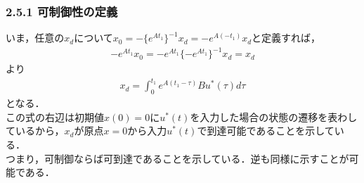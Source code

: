 \begin{frame}[t]
\frametitle{2.5.1 可制御性の定義}
いま，任意の$x_d$について$x_0=-\{e^{At_1} \}^{-1}x_d = -e^{A(-t_1)} x_d$と定義すれば，
\begin{align}
	-e^{At_1} x_0 = -e^{At_1} \{-e^{At_1} \}^{-1}x_d = x_d
\end{align}
より
\begin{align}
	x_d = \int_0^{t_1} e^{A(t_1-\tau)} B u^* (\tau) d \tau
\end{align}
となる．
\\[3mm]

この式の右辺は初期値$x(0)=0$に$u^*(t)$を入力した場合の状態の遷移を表わしているから，$x_d$が原点$x=0$から入力$u^*(t)$で到達可能であることを示している．
\\[3mm]

つまり，可制御ならば可到達であることを示している．逆も同様に示すことが可能である．
\end{frame}

